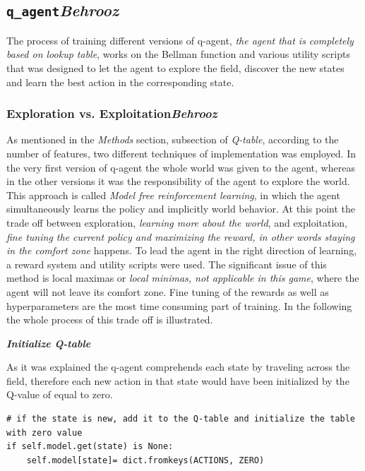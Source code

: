 \documentclass{article}
\begin{document}
\subsection[\texttt{q\_agent}]{\texttt{q\_agent}{\normalsize \normalfont \it \hfill Behrooz}}

The process of training different versions of q-agent, \textit{the agent that is completely based on lookup table}, works on the Bellman function and various utility scripts that was designed to let the agent to explore the field, discover the new states and learn the best action in the corresponding state.

\subsubsection[Exploration vs. Exploitation]{Exploration vs. Exploitation{\normalsize \normalfont \it \hfill Behrooz}}

As mentioned in the \textit{Methods} section, subsection of \textit{Q-table}, according to the number of features, two different techniques of implementation was employed. In the very first version of q-agent the whole world was given to the agent, whereas in the other versions it was the responsibility of the agent to explore the world. This approach is called \textit{Model free reinforcement learning}\cite{INTUITIVE-REINFORCEMENT}, in which the agent simultaneously learns the policy and implicitly world behavior. At this point the trade off between exploration, \textit{learning more about the world}, and exploitation, \textit{fine tuning the current policy and maximizing the reward, in other words staying in the comfort zone} happens. To lead the agent in the right direction of learning, a reward system and utility scripts were used. The significant issue of this method is local maximas or \textit{local minimas, not applicable in this game}, where the agent will not leave its comfort zone. Fine tuning of the rewards as well as hyperparameters are the most time consuming part of training. In the following the whole process of this trade off is illustrated.

\textbf{\textit{Initialize Q-table}}

As it was explained the q-agent comprehends each state by traveling across the field, therefore each new action in that state would have been initialized by the Q-value of equal to zero.

\begin{verbatim}
# if the state is new, add it to the Q-table and initialize the table with zero value 
if self.model.get(state) is None:
    self.model[state]= dict.fromkeys(ACTIONS, ZERO)
\end{verbatim}
\end{document}
